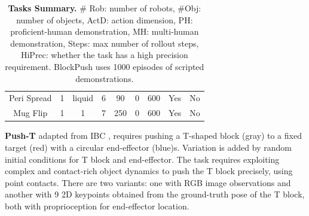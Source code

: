\documentclass[Afour,sageh,times]{sagej}
\begin{document}
\begin{table}
\begin{tabular}{c|cccccccc}
Peri Spread   & 1      & liquid      & 6    & 90   & 0     & 600       & Yes    & No  \\
Mug Flip  & 1      & 1      & 7    & 250   & 0     & 600       & Yes    & No  \\
\bottomrule
\end{tabular}
\caption{\textbf{Tasks Summary.} \# Rob: number of robots, \#Obj: number of objects, ActD: action dimension, PH: proficient-human demonstration, MH: multi-human demonstration, Steps: max number of rollout steps, HiPrec: whether the task has a high precision requirement. BlockPush uses 1000 episodes of scripted  demonstrations.}
\label{tab:robomimic_tasks} 
\vspace{-5mm}
\end{table}

\textbf{Push-T}
\label{sec:eval_sim_pusht}
adapted from IBC \cite{ibc}, requires pushing a T-shaped block (gray) to a fixed target (red) with a circular end-effector (blue)s. Variation is added by random initial conditions for T block and end-effector. The task requires exploiting complex and contact-rich object dynamics to push the T block precisely, using point contacts. There are two variants: one with RGB image observations and another with 9 2D keypoints obtained from the ground-truth pose of the T block, both with proprioception for end-effector location.
\end{document}
